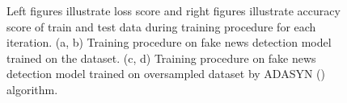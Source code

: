 \begin{figure}%
	\centering
	\qquad
	\qquad
	\qquad
	\caption{Left figures illustrate loss score and right figures illustrate accuracy score of train and test data during training procedure for each iteration. 
		(a, b) Training procedure on fake news detection model trained on the \cite{stance_persian} dataset.
		(c, d) Training procedure on fake news detection model trained on oversampled \cite{stance_persian} dataset by \ac{ADASYN} (\cite{adasyn}) algorithm.}%
	\label{fig:fakenews}%
\end{figure}